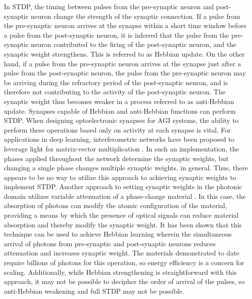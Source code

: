 \documentclass[twocolumn]{article}
\begin{document}
In STDP, the timing between pulses from the pre-synaptic neuron and post-synaptic neuron change the strength of the synaptic connection. If a pulse from the pre-synaptic neuron arrives at the synapse within a short time window before a pulse from the post-synaptic neuron, it is inferred that the pulse from the pre-synaptic neuron contributed to the firing of the post-synaptic neuron, and the synaptic weight strengthens. This is referred to as Hebbian update. On the other hand, if a pulse from the pre-synaptic neuron arrives at the synapse just after a pulse from the post-synaptic neuron, the pulse from the pre-synaptic neuron may be arriving during the refractory period of the post-synaptic neuron, and is therefore not contributing to the activity of the post-synaptic neuron. The synaptic weight thus becomes weaker in a process referred to as anti-Hebbian update. Synapses capable of Hebbian and anti-Hebbian functions can perform STDP. When designing optoelectronic synapses for AGI systems, the ability to perform these operations based only on activity at each synapse is vital. For applications in deep learning, interferometric networks have been proposed to leverage light for matrix-vector multiplication \cite{}. In such an implementation, the phases applied throughout the network determine the synaptic weights, but changing a single phase changes multiple synaptic weights, in general. Thus, there appears to be no way to utilize this approach to achieving synaptic weights to implement STDP. Another approach to setting synaptic weights in the photonic domain utilizes variable attenuation of a phase-change material \cite{}. In this case, the absorption of photons can modify the atomic configuration of the material, providing a means by which the presence of optical signals can reduce material absorption and thereby modify the synaptic weight. It has been shown that this technique can be used to achieve Hebbian learning wherein the simultaneous arrival of photons from pre-synaptic and post-synaptic neurons reduces attenuation and increases synaptic weight. The materials demonstrated to date require billions of photons for this operation, so energy efficiency is a concern for scaling. Additionally, while Hebbian strengthening is straightforward with this approach, it may not be possible to decipher the order of arrival of the pulses, so anti-Hebbian weakening and full STDP may not be possible.
\end{document}
